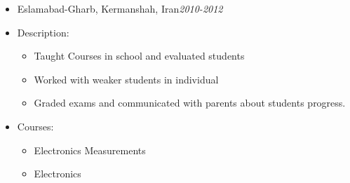 \begin {itemize}
\begin {itemize}
            \begin {itemize}
                \item [-]  {  Eslamabad-Gharb, Kermanshah, Iran\small \hspace{5cm}\textit{2010-2012}\normalsize} 
                \item [-]   { Description:} 
                    \begin {itemize}
                        \item [\textbullet]  Taught Courses in school and evaluated students
                        \item [\textbullet]  Worked  with weaker students in individual
                        \item [\textbullet]  Graded  exams and communicated with parents about students progress.
                    \end {itemize}
                     \item [-]   {   Courses:} 
                    \begin {itemize}   
                        \item [\textbullet]  Electronics Measurements
                         \item [\textbullet] Electronics
                    \end {itemize}    
            \end {itemize} \vspace{0.3cm}   
    \end {itemize}
\end {itemize}











